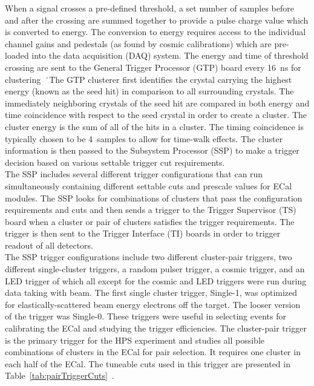 When a signal crosses a pre-defined threshold, a set number of samples before and after the crossing are summed together to provide a pulse charge value which is converted to energy. The conversion to energy requires access to the individual channel gains and pedestals (as found by cosmic calibrations) which are pre-loaded into the data acquisition (DAQ) system. The energy and time of threshold crossing are sent to the General Trigger Processor (GTP) board every 16~ns  for clustering~\cite{balossino_hps_2016}\.\
\indent The GTP clusterer first identifies the crystal carrying the highest energy (known as the seed hit) in comparison to all surrounding crystals. The immediately neighboring crystals of the seed hit are compared in both energy and time coincidence with respect to the seed crystal in order to create a cluster. The cluster energy is the sum of all of the hits in a cluster. The timing coincidence is typically chosen to be 4~samples to allow for time-walk effects. The cluster information is then passed to the Subsystem Processor (SSP) to make a trigger decision based on various settable trigger cut requirements. \\
\indent The SSP includes several different trigger configurations that can run simultaneously containing different settable cuts and prescale values for ECal modules. The SSP looks for combinations of clusters that pass the configuration requirements and cuts and then sends a trigger to the Trigger Supervisor (TS) board when a cluster or pair of clusters satisfies the trigger requirements. The trigger is then sent to the Trigger Interface (TI) boards in order to trigger readout of all detectors.\\ 
\indent The SSP trigger configurations include two different cluster-pair triggers, two different single-cluster triggers, a random pulser trigger, a cosmic trigger, and an LED trigger of which all except for the cosmic and LED triggers were run during data taking with beam. The first single cluster trigger, Single-1, was optimized for elastically-scattered beam energy electrons off the target. The looser version of the trigger was Single-0. These triggers were useful in selecting events for calibrating the ECal and studying the trigger efficiencies. The cluster-pair trigger is the primary trigger for the HPS experiment and studies all possible combinations of clusters in the ECal for pair selection. It requires one cluster in each half of the ECal. The tuneable cuts used in this trigger are presented in Table~\ref{tab:pairTriggerCuts}~\cite{balossino_hps_2016}. \\

